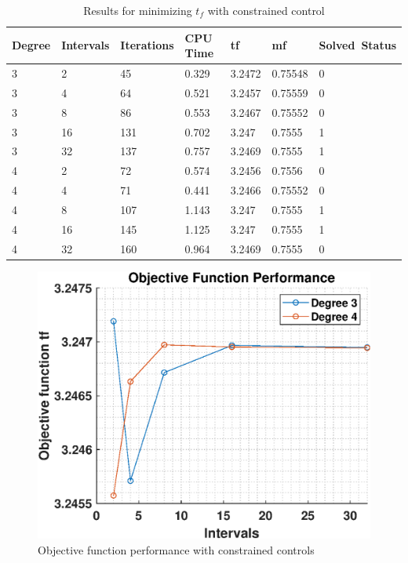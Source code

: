 \documentclass[]{article}
\begin{document}
	\begin{table}[h!]
		\begin{tabular}{lllllll}
			Degree & Intervals & Iterations & CPU Time & tf & mf & Solved\ Status \\ 
			\hline 
			3 & 2 & 45 & 0.329 & 3.2472 & 0.75548 & 0 \\ 
			3 & 4 & 64 & 0.521 & 3.2457 & 0.75559 & 0 \\ 
			3 & 8 & 86 & 0.553 & 3.2467 & 0.75552 & 0 \\ 
			3 & 16 & 131 & 0.702 & 3.247 & 0.7555 & 1 \\ 
			3 & 32 & 137 & 0.757 & 3.2469 & 0.7555 & 1 \\ 
			4 & 2 & 72 & 0.574 & 3.2456 & 0.7556 & 0 \\ 
			4 & 4 & 71 & 0.441 & 3.2466 & 0.75552 & 0 \\ 
			4 & 8 & 107 & 1.143 & 3.247 & 0.7555 & 1 \\ 
			4 & 16 & 145 & 1.125 & 3.247 & 0.7555 & 1 \\ 
			4 & 32 & 160 & 0.964 & 3.2469 & 0.7555 & 0 \\ 
			\hline 
		\end{tabular}
		\caption{Results for minimizing \(t_f\) with constrained control}
		\label{table:3}
	\end{table}
	\begin{figure}
		\centering
		\includegraphics[scale=0.75]{obj_c3_tf.eps}
		\caption{Objective function performance with constrained controls}
		\label{fig:obj_c3_tf}
	\end{figure}
\end{document}
